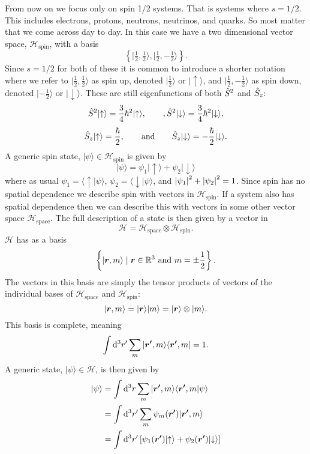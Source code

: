 \documentclass[a4paper]{article}
\renewcommand{\ket}[1]{\vert {#1} \rangle}
\renewcommand{\braket}[2]{\langle {#1} \vert {#2} \rangle}
\renewcommand{\ketbra}[2]{\vert {#1}\rangle\langle {#2} \vert}
\newcommand{\hilbert}{\mathcal{H}}
\renewcommand{\ident}{1}
\newcommand{\st}{\mid}
\newcommand{\tensorProd}{\otimes}
\newcommand{\spinUp}{\uparrow}
\newcommand{\spinDown}{\downarrow}
\theoremstyle{definition}
\begin{document}
    From now on we focus only on spin 1/2 systems.
    That is systems where \(s = 1/2\).
    This includes electrons, protons, neutrons, neutrinos, and quarks.
    So most matter that we come across day to day.
    In this case we have a two dimensional vector space, \(\hilbert_{\text{spin}}\), with a basis
    \[\left\{\ket{\tfrac{1}{2}, \tfrac{1}{2}}, \ket{\tfrac{1}{2}, -\tfrac{1}{2}}\right\}.\]
    Since \(s = 1/2\) for both of these it is common to introduce a shorter notation where we refer to \(\ket{\tfrac{1}{2}, \tfrac{1}{2}}\) as spin up, denoted \(\ket{\tfrac{1}{2}}\) or \(\ket{\spinUp}\), and \(\ket{\tfrac{1}{2}, -\tfrac{1}{2}}\) as spin down, denoted \(\ket{-\tfrac{1}{2}}\) or \(\ket{\spinDown}\).
    These are still eigenfunctions of both \(\hat{S}^2\) and \(\hat{S}_z\):
    \[\operator{S}^2\ket{\spinUp} = \frac{3}{4}\hbar^2\ket{\spinUp}, \qquad, \operator{S}^2\ket{\spinDown} = \frac{3}{4}\hbar^2\ket{\spinDown},\]
    \[\operator{S}_z\ket{\spinUp} = \frac{\hbar}{2}, \qquad\text{and}\qquad \operator{S}_z\ket{\spinDown} = -\frac{\hbar}{2}\ket{\spinDown}.\]
    A generic spin state, \(\ket{\psi}\in\hilbert_\text{spin}\) is given by
    \[\ket{\psi} = \psi_1\ket{\spinUp} + \psi_2\ket{\spinDown}\]
    where as usual \(\psi_1 = \braket{\spinUp}{\psi}\), \(\psi_2 = \braket{\spinDown}{\psi}\), and \(\abs{\psi_1}^2 + \abs{\psi_2}^2 = 1\).
    Since spin has no spatial dependence we describe spin with vectors in \(\hilbert_\text{spin}\).
    If a system also has spatial dependence then we can describe this with vectors in some other vector space \(\hilbert_\text{space}\).
    The full description of a state is then given by a vector in
    \[\hilbert = \hilbert_\text{space}\tensorProd\hilbert_\text{spin}.\]
    \(\hilbert\) has as a basis
    \[\left\{ \ket{\vv{r}, m}\st \vv{r}\in\reals^3 ~\text{and}~ m = \pm\frac{1}{2} \right\}.\]
    The vectors in this basis are simply the tensor products of vectors of the individual bases of \(\hilbert_\text{space}\) and \(\hilbert_\text{spin}\):
    \[\ket{\vv{r}, m} = \ket{\vv{r}}\ket{m} = \ket{\vv{r}}\tensorProd\ket{m}.\]
    This basis is complete, meaning
    \[\int \dd[3]{r'} \sum_{m} \ketbra{\vv{r'}, m}{\vv{r'}, m} = \ident.\]
    A generic state, \(\ket{\psi}\in\hilbert\), is then given by
    \begin{align*}
        \ket{\psi} &= \int\dd[3]{r} \sum_m \ket{\vv{r'}, m}\braket{\vv{r'}, m}{\psi}\\
        &= \int\dd[3]{r'}\sum_m \psi_m(\vv{r'})\ket{\vv{r'}, m}\\
        &= \int\dd[3]{r'}\left[\psi_1(\vv{r'})\ket{\spinUp} + \psi_2(\vv{r'})\ket{\spinDown}\right]
    \end{align*}
\end{document}
